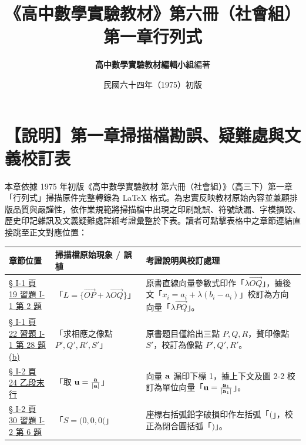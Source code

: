 \documentclass[a4paper,12pt,twoside]{article}
\title{\LARGE\textbf{《高中數學實驗教材》第六冊（社會組）}\\[0.5em] \Large\textbf{第一章\quad 行列式}}
\author{\textbf{高中數學實驗教材編輯小組}\quad 編著}
\date{民國六十四年（1975）初版}
\begin{document}
\maketitle
\thispagestyle{firstpage}

\section*{【說明】第一章掃描檔勘誤、疑難處與文義校訂表}
\label{sec:errata_notes_b6_ch1}
\label{sec:current_errata}

本章依據 1975 年初版《高中數學實驗教材 第六冊（社會組）》（高三下）第一章「行列式」掃描原件完整轉錄為 \LaTeX{} 格式。為忠實反映教材原始內容並兼顧排版品質與嚴謹性，依作業規範將掃描檔中出現之印刷訛誤、符號缺漏、字模損毀、歷史印記雜訊及文義疑難處詳細考證彙整於下表。讀者可點擊表格中之章節連結直接跳至正文對應位置：

\begin{table}[H]
\centering
\small
\renewcommand{\arraystretch}{1.35}
\begin{tabularx}{\textwidth}{|p{3.2cm}|p{3.8cm}|X|}
\hline
\textbf{章節位置} & \textbf{掃描檔原始現象 / 誤植} & \textbf{考證說明與校訂處理} \\ \hline

\hyperref[note:b6s-ch1-p19-l-eq]{§ I-1 頁 19 習題 I-1 第 2 題} & 
「$L = \{ \vec{OP} + \lambda\vec{OQ} \}$」 & 
原書直線向量參數式印作「$\lambda\vec{OQ}$」，據後文「$x_i = a_i + \lambda(b_i - a_i)$」校訂為方向向量「$\lambda\vec{PQ}$」。 \\ \hline

\hyperref[note:b6s-ch1-p22-ex28-s]{§ I-1 頁 22 習題 I-1 第 28 題 (b)} & 
「求相應之像點 $P', Q', R', S'$」 & 
原書題目僅給出三點 $P, Q, R$，贅印像點 $S'$，校訂為像點 $P', Q', R'$。 \\ \hline

\hyperref[note:b6s-ch1-p24-u]{§ I-2 頁 24 乙段末行} & 
「取 $\boldsymbol{\mathbf{u}}=\frac{\boldsymbol{\mathbf{a}}}{|\boldsymbol{\mathbf{a}}|}$」 & 
向量 $\boldsymbol{\mathbf{a}}$ 漏印下標 1，據上下文及圖 2-2 校訂為單位向量「$\boldsymbol{\mathbf{u}}=\frac{\boldsymbol{\mathbf{a}}_1}{|\boldsymbol{\mathbf{a}}_1|}$」。 \\ \hline

\hyperref[note:b6s-ch1-p30-s-coord]{§ I-2 頁 30 習題 I-2 第 6 題} & 
「$S=(0,0,0($」 & 
座標右括弧鉛字破損印作左括弧「$($」，校正為閉合圓括弧「$)$」。 \\ \hline

\end{tabularx}
\end{table}

\newpage
\renewcommand{\contentsname}{目\qquad 次}
\tableofcontents
\newpage


\end{document}
